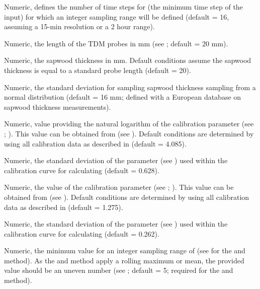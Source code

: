 \documentclass[a4paper]{book}
\begin{document}
\begin{Arguments}
\begin{ldescription}
\item[\code{range.start}] Numeric, defines the number of time steps for  (the minimum time step of the input)
for which an integer sampling range will be defined (default = 16, assuming a 15-min resolution or a 2 hour range).

\item[\code{probe.length}] Numeric, the length of the TDM probes in mm (see ; default = 20 mm).

\item[\code{sw.cor}] Numeric, the sapwood thickness in mm. Default conditions assume the sapwood thickness is equal to a standard probe length (default = 20).

\item[\code{sw.sd}] Numeric, the standard deviation for sampling sapwood thickness sampling from a normal distribution (default = 16 mm;
defined with a European database on sapwood thickness measurements).

\item[\code{log.a\_mu}] Numeric, value providing the natural logarithm of the calibration parameter  (see ; ).
This value can be obtained from  (see ).
Default conditions are determined by using all calibration data as described in  (default = 4.085).

\item[\code{log.a\_sd}] Numeric, the standard deviation of the  parameter (see ) used within the calibration curve
for calculating  (default = 0.628).

\item[\code{b\_mu}] Numeric, the value of the calibration parameter  (see ; ).
This value can be obtained from  (see ).
Default conditions are determined by using all calibration data as described in  (default = 1.275).

\item[\code{b\_sd}] Numeric, the standard deviation of the  parameter (see ) used within the calibration curve
for calculating  (default = 0.262).

\item[\code{max.days\_min}] Numeric, the minimum value for an integer sampling range of 
(see  for the  and   method).
As the  and  method apply a rolling maximum or mean, the provided value should be an
uneven number (see ; default = 5; required for the  and   method).


\end{ldescription}
\end{Arguments}
\end{document}

